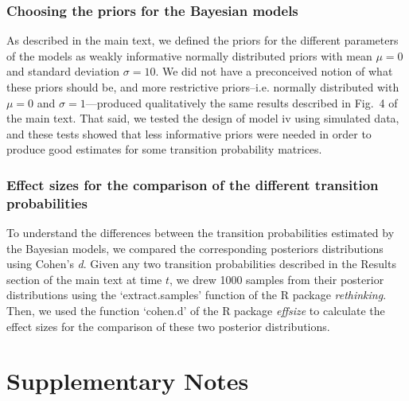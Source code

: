 \documentclass[11pt, a4paper]{article}
\begin{document}
\subsubsection*{Choosing the priors for the Bayesian models}
As described in the main text, we defined the priors for the different parameters of the models as weakly informative normally distributed priors with mean $\mu=0$ and standard deviation $\sigma=10$. We did not have a preconceived notion of what these priors should be, and more restrictive priors--i.e.\,\,normally distributed with $\mu=0$ and $\sigma=1$---produced qualitatively the same results described in Fig.~4 of the main text. That said, we tested the design of model iv using simulated data, and these tests showed that less informative priors were needed in order to produce good estimates for some transition probability matrices.

\subsubsection*{Effect sizes for the comparison of the different transition probabilities}
To understand the differences between the transition probabilities estimated by the Bayesian models, we compared the corresponding posteriors distributions using Cohen's \textit{d}. Given any two transition probabilities described in the Results section of the main text at time $t$, we drew 1000 samples from their posterior distributions using the `extract.samples' function of the R package \textit{rethinking}\cite{mcelreath2018statisticalWAIC}. Then, we used the function `cohen.d' of the R package \textit{effsize}\cite{torchiano2017effsize} to calculate the effect sizes for the comparison of these two posterior distributions.

\section*{Supplementary Notes}
\setcounter{subsubsection}{0}
\end{document}

